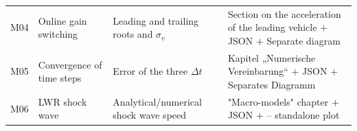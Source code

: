 \documentclass[11pt,a4paper,openany]{book}
\numberwithin{equation}{chapter}
\numberwithin{figure}{chapter}
\numberwithin{table}{chapter}
\begin{document}
\begin{center}
\begin{tabular}{p{1.1cm}p{3.5cm}p{4.4cm}p{4.4cm}}
\\
M04 &






Online gain switching






&






Leading and trailing roots and $\sigma_v$






&






Section on the acceleration of the leading vehicle $+$ JSON $+$ Separate diagram





\\
M05 &






Convergence of time steps






&






Error of the three $\Delta t$






&




Kapitel „Numerische Vereinbarung“ $+$ JSON $+$ Separates Diagramm



\\
M06 &






LWR shock wave






&






Analytical/numerical shock wave speed






&






"Macro-models" chapter $+$ JSON $+$ – standalone plot







\end{tabular}
\end{center}
\end{document}
